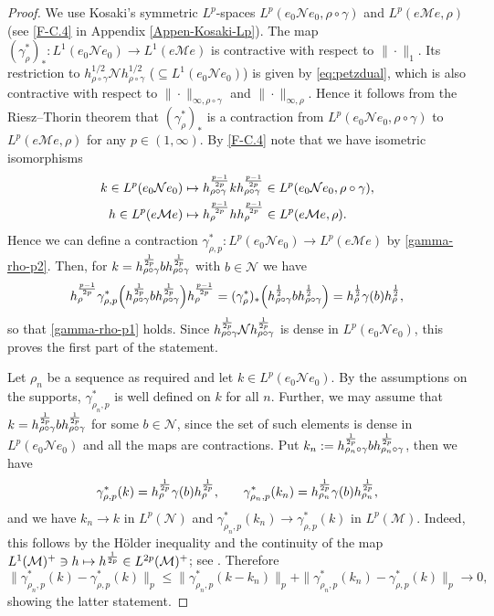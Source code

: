 \documentclass[12pt]{article}
\theoremstyle{definition}
\theoremstyle{remark}
\numberwithin{equation}{section}
\def\Me{\mathcal M}
\def\Ne{\mathcal N}
\begin{document}
\begin{proof}
We use Kosaki's symmetric $L^p$-spaces $L^p(e_0\Ne e_0,\rho\circ\gamma)$ and
$L^p(e\Me e,\rho)$ (see \eqref{F-C.4} in Appendix \ref{Appen-Kosaki-Lp}). The map
$(\gamma_\rho^*)_*:L^1(e_0\Ne e_0)\to L^1(e\Me e)$ is contractive
with respect to $\|\cdot\|_1$. Its restriction to $h_{\rho\circ\gamma}^{1/2}\Ne h_{\rho\circ\gamma}^{1/2}$
($\subseteq L^1(e_0\Ne e_0)$) is given by \eqref{eq:petzdual}, which is also contractive with respect
to $\|\cdot\|_{\infty,\rho\circ\gamma}$ and $\|\cdot\|_{\infty,\rho}$. Hence it follows from the Riesz--Thorin
theorem that $(\gamma_\rho^*)_*$ is a contraction from $L^p(e_0\Ne e_0,\rho\circ\gamma)$ to
$L^p(e\Me e,\rho)$ for any $p\in(1,\infty)$. By \eqref{F-C.4} note that we have isometric isomorphisms
\begin{align*}
k\in L^p(e_0\Ne e_0)&\mapsto h_{\rho\circ\gamma}^{p-1\over2p}kh_{\rho\circ\gamma}^{p-1\over2p}
\in L^p(e_0\Ne e_0,\rho\circ\gamma), \\
h\in L^p(e\Me e)&\mapsto h_\rho^{p-1\over2p}hh_\rho^{p-1\over2p}\in L^p(e\Me e,\rho).
\end{align*}
Hence we can define a contraction $\gamma_{\rho,p}^*:L^p(e_0\Ne e_0)\to L^p(e\Me e)$ by
\eqref{gamma-rho-p2}. Then, for $k=h_{\rho\circ\gamma}^{1\over2p}bh_{\rho\circ\gamma}^{1\over2p}$
with $b\in\Ne$ we have
\[
h_\rho^{p-1\over2p}\gamma_{\rho,p}^*\Bigl(h_{\rho\circ\gamma}^{1\over2p}b
h_{\rho\circ\gamma}^{1\over2p}\Bigr)h_\rho^{p-1\over2p}
=(\gamma_\rho^*)_*\Bigl(h_{\rho\circ\gamma}^{1\over2}bh_{\rho\circ\gamma}^{1\over2}\Bigr)
=h_\rho^{1\over2}\gamma(b)h_\rho^{1\over2},
\]
so that \eqref{gamma-rho-p1} holds.
Since $h_{\rho\circ\gamma}^{1\over 2p}\Ne h^{1\over
2p}_{\rho\circ\gamma}$ is dense in $L^p(e_0 \Ne e_0)$, this proves the first part of the statement.

Let $\rho_n$ be a sequence as required and let $k\in L^p(e_0 \Ne e_0)$. By the
assumptions on the supports, $\gamma^*_{\rho_n,p}$ is well defined on $k$ for all $n$.
Further, we may assume that $k=h_{\rho\circ\gamma}^{1\over 2p}b
h_{\rho\circ\gamma}^{1\over 2p}$ for some $b\in \Ne$, since the set of such elements is
dense in $L^p(e_0 \Ne e_0)$ and all the maps are contractions. 
Put $k_n:=h_{\rho_n\circ\gamma}^{1\over 2p}b
h_{\rho_n\circ\gamma}^{1\over 2p}$, then we have
\[
\gamma^*_{\rho,p}(k)={h_\rho^{1\over2p}\gamma(b)h_\rho^{1\over2p},}\qquad
\gamma^*_{\rho_n,p}(k_n)= {h_{\rho_n}^{1\over2p}\gamma(b)h_{\rho_n}^{1\over2p},}
\]
and we have $k_n\to k$ in $L^p(\Ne)$ and  $\gamma^*_{\rho_n,p}(k_n)\to
\gamma^*_{\rho,p}(k)$ in $L^p(\Me)$. Indeed, this follows by the H\"older inequality and the
continuity of the map $L^1(\Me)^+\ni h\mapsto {h^{1\over2p}\in L^{2p}(\Me)^+}$; see
\cite[Lemma 3.4]{kosaki1984applicationsuc}. Therefore
\[
\|\gamma^*_{\rho_n,p}(k)-\gamma^*_{\rho,p}(k)\|_p\le
\|\gamma^*_{\rho_n,p}(k-k_n)\|_p+\|\gamma^*_{\rho_n,p}(k_n)-\gamma^*_{\rho,p}(k)\|_p\to 0,
\]
showing the latter statement.
\end{proof}
\end{document}
